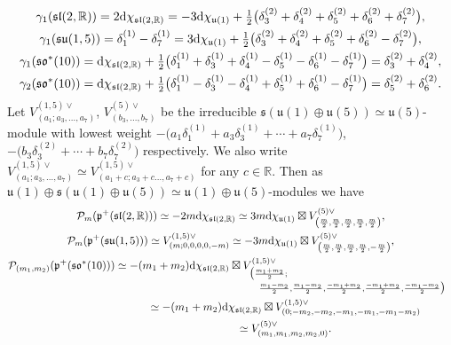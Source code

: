 \documentclass[pdftex]{sigma}
\numberwithin{equation}{section}
\newcommand{\BR}{\mathbb{R}}
\newcommand{\fp}{\mathfrak{p}}
\newcommand{\cP}{\mathcal{P}}
\begin{document}
\begin{gather*}
\gamma_1(\mathfrak{sl}(2,\BR)) =2{\rm d}\chi_{\mathfrak{sl}(2,\BR)}
=-3{\rm d}\chi_{\mathfrak{u}(1)}+\tfrac{1}{2}\big(\delta_3^{(2)}+\delta_4^{(2)}+\delta_5^{(2)}+\delta_6^{(2)}+\delta_7^{(2)}\big),\\
\gamma_1(\mathfrak{su}(1,5)) =\delta_1^{(1)}-\delta_7^{(1)}
=3{\rm d}\chi_{\mathfrak{u}(1)}+\tfrac{1}{2}\big(\delta_3^{(2)}+\delta_4^{(2)}+\delta_5^{(2)}+\delta_6^{(2)}-\delta_7^{(2)}\big),\\
\gamma_1(\mathfrak{so}^*(10))
 ={\rm d}\chi_{\mathfrak{sl}(2,\BR)}+\tfrac{1}{2}\big(\delta_1^{(1)}+\delta_3^{(1)}+\delta_4^{(1)}-\delta_5^{(1)}-\delta_6^{(1)}-\delta_7^{(1)}\big)
=\delta_3^{(2)}+\delta_4^{(2)},\\
\gamma_2(\mathfrak{so}^*(10))
 ={\rm d}\chi_{\mathfrak{sl}(2,\BR)}+\tfrac{1}{2}\big(\delta_1^{(1)}-\delta_3^{(1)}-\delta_4^{(1)}+\delta_5^{(1)}+\delta_6^{(1)}-\delta_7^{(1)}\big)
=\delta_5^{(2)}+\delta_6^{(2)}.
\end{gather*}
Let $V_{(a_1;a_3,\ldots,a_7)}^{(1,5)\vee}$, $V_{(b_3,\ldots,b_7)}^{(5)\vee}$ be the irreducible
$\mathfrak{s}(\mathfrak{u}(1)\oplus\mathfrak{u}(5))\simeq\mathfrak{u}(5)$-module with lowest weight
$-\big(a_1\delta_1^{(1)}+a_3\delta_3^{(1)}+\cdots+a_7\delta_7^{(1)}\big)$, $-\big(b_3\delta_3^{(2)}+\cdots+b_7\delta_7^{(2)}\big)$ respectively.
We also write $V_{(a_1;a_3,\ldots,a_7)}^{(1,5)\vee}\simeq V_{(a_1+c;a_3+c\ldots,a_7+c)}^{(1,5)\vee}$ for any $c\in\BR$.
Then as $\mathfrak{u}(1)\oplus\mathfrak{s}(\mathfrak{u}(1)\oplus\mathfrak{u}(5))\simeq\mathfrak{u}(1)\oplus\mathfrak{u}(5)$-modules we have
\begin{gather*}
\cP_m(\fp^+(\mathfrak{sl}(2,\BR))) \simeq -2m{\rm d}\chi_{\mathfrak{sl}(2,\BR)}
\simeq 3m{\rm d}\chi_{\mathfrak{u}(1)}\boxtimes V_{\left(\frac{m}{2},\frac{m}{2},\frac{m}{2},\frac{m}{2},\frac{m}{2}\right)}^{(5)\vee},\\
\cP_m(\fp^+(\mathfrak{su}(1,5))) \simeq V_{(m;0,0,0,0,-m)}^{(1,5)\vee}
\simeq -3m{\rm d}\chi_{\mathfrak{u}(1)}\boxtimes V_{\left(\frac{m}{2},\frac{m}{2},\frac{m}{2},\frac{m}{2},-\frac{m}{2}\right)}^{(5)\vee},\\
\cP_{(m_1,m_2)}(\fp^+(\mathfrak{so}^*(10))) \simeq -(m_1+m_2){\rm d}\chi_{\mathfrak{sl}(2,\BR)}\boxtimes
V_{\substack{\bigl(\frac{m_1+m_2}{2};\hspace{150pt}\\
\; \frac{m_1-m_2}{2},\frac{m_1-m_2}{2},\frac{-m_1+m_2}{2},\frac{-m_1+m_2}{2},\frac{-m_1-m_2}{2}\bigr)}}^{(1,5)\vee}\\
\hphantom{\cP_{(m_1,m_2)}(\fp^+(\mathfrak{so}^*(10)))}{} \simeq -(m_1+m_2){\rm d}\chi_{\mathfrak{sl}(2,\BR)}\boxtimes V_{(0;-m_2,-m_2,-m_1,-m_1,-m_1-m_2)}^{(1,5)\vee}\\
\hphantom{\cP_{(m_1,m_2)}(\fp^+(\mathfrak{so}^*(10)))}{}\simeq V_{(m_1,m_1,m_2,m_2,0)}^{(5)\vee}.
\end{gather*}
\end{document}
